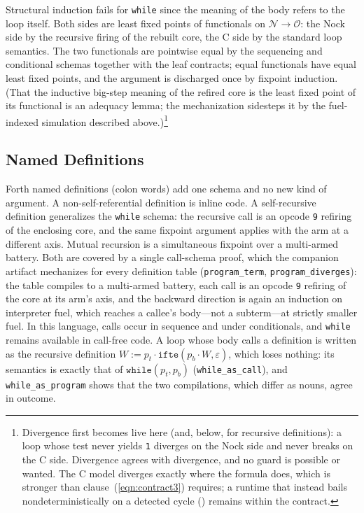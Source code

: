 \documentclass[twoside]{article}
\begin{document}
\noindent
Structural induction fails for \lstinline[style=inlinecode]{while} since the meaning of the body refers to the loop itself.  Both sides are least fixed points of functionals on $\mathcal{N} \to \mathcal{O}$: the Nock side by the recursive firing of the rebuilt core, the C side by the standard loop semantics.  The two functionals are pointwise equal by the sequencing and conditional schemas together with the leaf contracts; equal functionals have equal least fixed points, and the argument is discharged once by fixpoint induction.  (That the inductive big-step meaning of the refired core is the least fixed point of its functional is an adequacy lemma; the mechanization sidesteps it by the fuel-indexed simulation described above.)\footnote{Divergence first becomes live here (and, below, for recursive definitions): a loop whose test never yields \texttt{1} diverges on the Nock side and never breaks on the C side.  Divergence agrees with divergence, and no guard is possible or wanted.  The C model diverges exactly where the formula does, which is stronger than clause~(\ref{eqn:contract3}) requires; a runtime that instead bails nondeterministically on a detected cycle () remains within the contract.}

\subsection{Named Definitions}

Forth named definitions (colon words) add one schema and no new kind of argument.  A non-self-referential definition is inline code.  A self-recursive definition generalizes the \lstinline[style=inlinecode]{while} schema:  the recursive call is an opcode \lstinline[style=inlinecode]{9} refiring of the enclosing core, and the same fixpoint argument applies with the arm at a different axis.  Mutual recursion is a simultaneous fixpoint over a multi-armed battery.  Both are covered by a single call-schema proof, which the companion artifact mechanizes for every definition table (\lstinline[style=inlinecode]{program_term}, \lstinline[style=inlinecode]{program_diverges}):  the table compiles to a multi-armed battery, each call is an opcode \lstinline[style=inlinecode]{9} refiring of the core at its arm's axis, and the backward direction is again an induction on interpreter fuel, which reaches a callee's body---not a subterm---at strictly smaller fuel.  In this language, calls occur in sequence and under conditionals, and \lstinline[style=inlinecode]{while} remains available in call-free code.  A loop whose body calls a definition is written as the recursive definition $W := p_t \cdot \texttt{ifte}(p_b \cdot W, \varepsilon)$, which loses nothing:  its semantics is exactly that of $\texttt{while}(p_t, p_b)$ (\lstinline[style=inlinecode]{while_as_call}), and \lstinline[style=inlinecode]{while_as_program} shows that the two compilations, which differ as nouns, agree in outcome.
\end{document}
